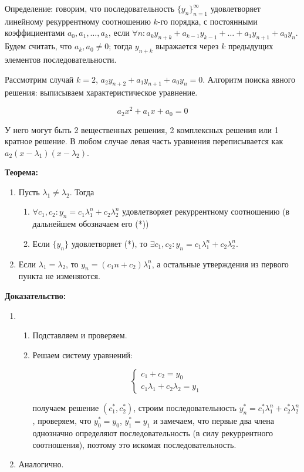 \documentclass[12pt]{article}
\begin{document}
Определение: говорим, что последовательность $\{ y_n \}_{n=1}^\infty$ удовлетворяет линейному рекуррентному соотношению $k$-го порядка, с постоянными коэффициентами $a_0, a_1, \ldots, a_k$, если $\forall n \colon a_k y_{n + k} + a_{k - 1} y_{k - 1} + \ldots + a_1 y_{n + 1} + a_0 y_n$. Будем считать, что $a_k, a_0 \neq 0$; тогда $y_{n + k}$ выражается через $k$ предыдущих элементов последовательности.

Рассмотрим случай $k = 2$, $a_2 y_{n + 2} + a_1 y_{n + 1} + a_0 y_n = 0$. Алгоритм поиска явного решения: выписываем характеристическое уравнение.

\[
a_2 x^2 + a_1 x + a_0 = 0
\]

У него могут быть 2 вещественных решения, 2 комплексных решения или 1 кратное решение. В любом случае левая часть уравнения переписывается как $a_2 (x - \lambda_1) (x - \lambda_2)$.

\textbf{Теорема:}

\begin{enumerate}
\item
    Пусть $\lambda_1 \neq \lambda_2$. Тогда
    \begin{enumerate}
    \item $\forall c_1, c_2 \colon y_n = c_1 \lambda_1^n + c_2 \lambda_2^n$ удовлетворяет рекуррентному соотношению (в дальнейшем обозначаем его (*))
    \item Если $\{ y_n \}$ удовлетворяет (*), то $\exists c_1, c_2 \colon y_n = c_1 \lambda_1^n + c_2 \lambda_2^n$.
    \end{enumerate}
\item
    Если $\lambda_1 = \lambda_2$, то $y_n = (c_1 n + c_2) \lambda_1^n$, а остальные утверждения из первого пункта не изменяются.
\end{enumerate}


\textbf{Доказательство:}
\begin{enumerate}
\item
\begin{enumerate}
\item Подставляем и проверяем.
\item Решаем систему уравнений:

\[
\begin{cases}
c_1 + c_2 = y_0 \\
c_1 \lambda_1 + c_2 \lambda_2 = y_1
\end{cases}
\]

получаем решение $(c_1^*, c_2^*)$, строим последовательность $y_n^* = c_1^* \lambda_1^n + c_2^* \lambda_2^n$, проверяем, что $y_0^* = y_0$, $y_1^* = y_1$ и замечаем, что первые два члена однозначно определяют последовательность (в силу рекуррентного соотношения), поэтому это искомая последовательность.
\end{enumerate}
\item Аналогично.
\end{enumerate}
\end{document}
